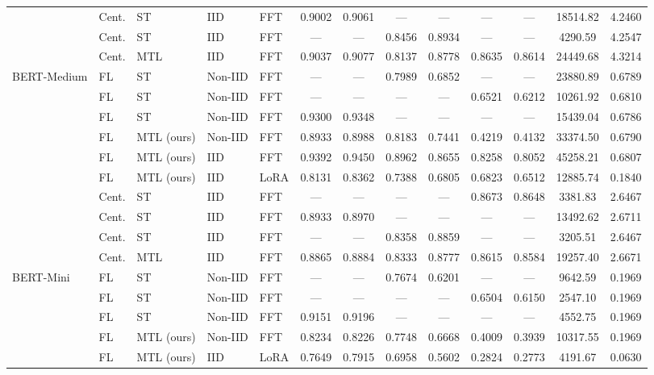\begin{table}[t]
\begin{tabular}{lllllcccccccc}
     & Cent. & ST & IID & FFT & 0.9002 & 0.9061 & --- & --- & --- & --- & 18514.82 & 4.2460 \\
     & Cent. & ST & IID & FFT & --- & --- & 0.8456 & 0.8934 & --- & --- & 4290.59 & 4.2547 \\
     & Cent. & MTL & IID & FFT & 0.9037 & 0.9077 & 0.8137 & 0.8778 & 0.8635 & 0.8614 & 24449.68 & 4.3214 \\
    \midrule
    BERT-Medium \cite{turc2019well} & FL & ST & Non-IID & FFT & --- & --- & 0.7989 & 0.6852 & --- & --- & 23880.89 & 0.6789 \\
     & FL & ST & Non-IID & FFT & --- & --- & --- & --- & 0.6521 & 0.6212 & 10261.92 & 0.6810 \\
     & FL & ST & Non-IID & FFT & 0.9300 & 0.9348 & --- & --- & --- & --- & 15439.04 & 0.6786 \\
      & FL & MTL (ours) & Non-IID & FFT & 0.8933 & 0.8988 & 0.8183 & 0.7441 & 0.4219 & 0.4132 & 33374.50 & 0.6790 \\
      & FL & MTL (ours) & IID & FFT & 0.9392 & 0.9450 & 0.8962 & 0.8655 & 0.8258 & 0.8052 & 45258.21 & 0.6807 \\
     & FL & MTL (ours) & IID & LoRA & 0.8131 & 0.8362 & 0.7388 & 0.6805 & 0.6823 & 0.6512 & 12885.74 & 0.1840 \\
     & Cent. & ST & IID & FFT & --- & --- & --- & --- & 0.8673 & 0.8648 & 3381.83 & 2.6467 \\
     & Cent. & ST & IID & FFT & 0.8933 & 0.8970 & --- & --- & --- & --- & 13492.62 & 2.6711 \\
     & Cent. & ST & IID & FFT & --- & --- & 0.8358 & 0.8859 & --- & --- & 3205.51 & 2.6467 \\
     & Cent. & MTL & IID & FFT & 0.8865 & 0.8884 & 0.8333 & 0.8777 & 0.8615 & 0.8584 & 19257.40 & 2.6671 \\
    \midrule
    BERT-Mini \cite{turc2019well} & FL & ST & Non-IID & FFT & --- & --- & 0.7674 & 0.6201 & --- & --- & 9642.59 & 0.1969 \\
     & FL & ST & Non-IID & FFT & --- & --- & --- & --- & 0.6504 & 0.6150 & 2547.10 & 0.1969 \\
     & FL & ST & Non-IID & FFT & 0.9151 & 0.9196 & --- & --- & --- & --- & 4552.75 & 0.1969 \\
      & FL & MTL (ours) & Non-IID & FFT & 0.8234 & 0.8226 & 0.7748 & 0.6668 & 0.4009 & 0.3939 & 10317.55 & 0.1969 \\
     & FL & MTL (ours) & IID & LoRA & 0.7649 & 0.7915 & 0.6958 & 0.5602 & 0.2824 & 0.2773 & 4191.67 & 0.0630 \\

\end{tabular}
\end{table}
